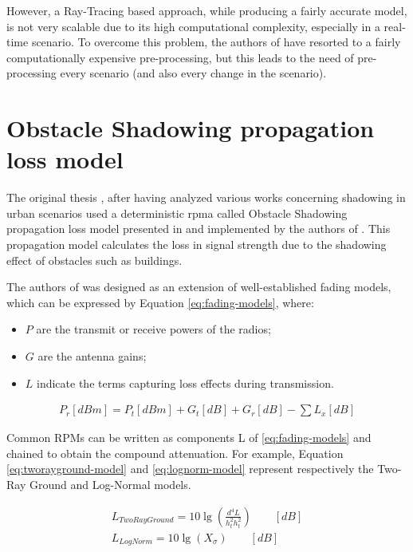 		
		However, a Ray-Tracing based approach, while producing a fairly accurate model, is not very scalable due to its high computational complexity, especially in a real-time scenario. To overcome this problem, the authors of \cite{STEPANOV200861} have resorted to a fairly computationally expensive pre-processing, but this leads to the need of pre-processing every scenario (and also every change in the scenario).
		
		
	
	\section{Obstacle Shadowing propagation loss model}
		The original thesis \cite{ROM2017}, after having analyzed various works concerning shadowing in urban scenarios \cite{Giordano:2010:CST:1860058.1860065} \cite{4020783} used a deterministic \gls{rpma} called Obstacle Shadowing propagation loss model presented in \cite{5720204} and implemented by the authors of \cite{Carpenter:2015:OMI:2756509.2756512}.  This propagation model calculates the loss in signal strength due to the shadowing effect of obstacles such as buildings. 
		
		
		The authors of \cite{5720204} was designed as an extension of well-established fading models, which can be expressed by Equation \ref{eq:fading-models}, where:
		\begin{itemize}
			\item $P$ are the transmit or receive powers of the radios;
			\item $G$ are the antenna gains;
			\item $L$ indicate the terms capturing loss effects during transmission.
		\end{itemize}
		
		\begin{gather}
			P_r[dBm] = P_t[dBm] + G_t[dB] + G_r[dB] - \sum L_x[dB] 														\label{eq:fading-models}
		\end{gather}
	
		Common RPMs can be written as components L of \ref{eq:fading-models} and chained to obtain the compound attenuation. For example, Equation \ref{eq:tworayground-model} and \ref{eq:lognorm-model} represent respectively the Two-Ray Ground and Log-Normal models.

		\begin{gather}
			L_{TwoRayGround} = 10 \lg \left( \frac{d^4 L}{h^2_t h^2_t} \right)	\qquad [dB]		\label{eq:tworayground-model} \\
			L_{LogNorm} = 10 \lg \left( X_\sigma \right)	\qquad [dB]													\label{eq:lognorm-model}
		\end{gather}
		
